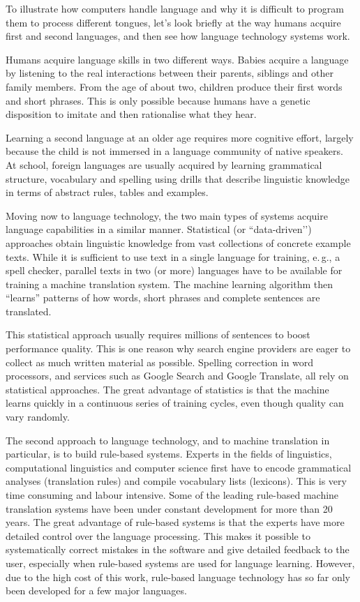 \begin{multicols}{2}
To illustrate how computers handle language and why it is difficult to program them to process different tongues, let’s look briefly at the way humans acquire first and second languages, and then see how language technology systems work.

Humans acquire language skills in two different ways. Babies acquire a language by listening to the real interactions between their parents, siblings and other family members. From the age of about two, children produce their first words and short phrases. This is only possible because humans have a genetic disposition to imitate and then rationalise what they hear. 

Learning a second language at an older age requires more cognitive effort, largely because the child is not immersed in a language community of native speakers. At school, foreign languages are usually acquired by learning grammatical structure, vocabulary and spelling using drills that describe linguistic knowledge in terms of abstract rules, tables and examples.


Moving now to language technology, the two main types of systems acquire language capabilities in a similar manner. Statistical (or ``data-driven’') approaches obtain linguistic knowledge from vast collections of concrete example texts. While it is sufficient to use text in a single language for training, e.\,g., a spell checker, parallel texts in two (or more) languages have to be available for training a machine translation system. The machine learning algorithm then “learns” patterns of how words, short phrases and complete sentences are translated. 

This statistical approach usually requires millions of sentences to boost performance quality. This is one reason why search engine providers are eager to collect as much written material as possible. Spelling correction in word processors, and services such as Google Search and Google Translate, all rely on statistical approaches. The great advantage of statistics is that the machine learns quickly in a continuous series of training cycles, even though quality can vary randomly.

The second approach to language technology, and to machine translation in particular, is to build rule-based systems. Experts in the fields of linguistics, computational linguistics and computer science first have to encode grammatical analyses (translation rules) and compile vocabulary lists (lexicons). This is very time consuming and labour intensive. Some of the leading rule-based machine translation systems have been under constant development for more than 20 years. The great advantage of rule-based systems is that the experts have more detailed control over the language processing. This makes it possible to systematically correct mistakes in the software and give detailed feedback to the user, especially when rule-based systems are used for language learning. However, due to the high cost of this work, rule-based language technology has so far only been developed for a few major languages. 


\end{multicols}
